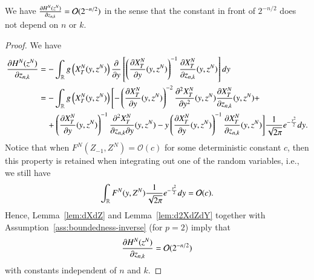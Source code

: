 \documentclass{amsart}
\begin{document}
\begin{proposition}
  \label{prop:first-derivatives}
  We have $\frac{\partial H^N(z^N)}{\partial z_{n,k}} = \mathcal{O}(2^{-n/2})$ in the sense
  that the constant in front of $2^{-n/2}$ does not depend on $n$ or $k$.
\end{proposition}
\begin{proof}
  We have
  \begin{align*}
    \frac{\partial H^N(z^N)}{\partial z_{n,k}} &= -\int_{\mathbb{R}} g\left( X^N_T
      (y, z^N) \right) \frac{\partial}{\partial y} \left[ \left( \frac{\partial X^N_T}{\partial y}(y, z^N)
  \right)^{-1} \frac{\partial X^N_T}{\partial z_{n,k}}(y, z^N) \right] dy\\
    &= -\int_{\mathbb{R}} g\left( X^N_T(y, z^N) \right) \Biggl[- \left( \frac{\partial
      X^N_T}{\partial y}(y, z^N) \right)^{-2} \frac{\partial^2 X^N_T}{\partial y^2}(y, z^N)
      \frac{\partial X^N_T}{\partial z_{n,k}}(y, z^N) +\\
    &\quad+ \left( \frac{\partial X^N_T}{\partial y}(y, z^N) \right)^{-1} \frac{\partial^2
      X^N_T}{\partial z_{n,k} \partial y}(y, z^N) - y \left( \frac{\partial X^N_T}{\partial y}(y, z^N)
  \right)^{-1} \frac{\partial X^N_T}{\partial z_{n,k}}(y, z^N) \Biggr] \frac{1}{\sqrt{2\pi}}
                                    e^{-\frac{y^2}{2}}dy.
  \end{align*}
  Notice that when $F^N(Z_{-1}, Z^N) = \mathcal{O}(c)$ for some deterministic
  constant $c$, then this property is retained when integrating out one of the
  random variables, i.e., we still have
  \begin{equation*}
    \int_{\mathbb{R}} F^N(y, Z^N) \frac{1}{\sqrt{2\pi}} e^{-\frac{y^2}{2}}dy = \mathcal{O}(c).
  \end{equation*}
  Hence, Lemma~\ref{lem:dXdZ} and Lemma~\ref{lem:d2XdZdY} together with
  Assumption~\ref{ass:boundedness-inverse} (for $p=2$) imply that
  \begin{equation*}
    \frac{\partial H^N(z^N)}{\partial z_{n,k}} = \mathcal{O}(2^{-n/2})
  \end{equation*}
  with constants independent of $n$ and $k$.
\end{proof}
\end{document}
